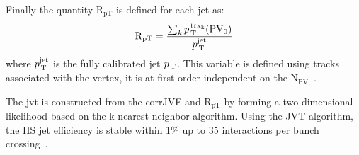 Finally the quantity $\mathrm{R_{pT}}$ is defined for each jet as:
\begin{equation}
  \label{eq:79}
  \mathrm{R_{pT}} = \frac{\sum_k p_\mathrm{\, T}^\mathrm{\, trk_k}
    (\mathrm{PV_0})}{p_\mathrm{\, T}^{\mathrm{jet}}}
\end{equation}
where $p_\mathrm{\, T}^{\mathrm{jet}}$ is the fully calibrated jet $p_\mathrm{\, T}$. This variable is
defined using tracks associated with the vertex, it is at first order
independent on the N$_{\mathrm{PV}}$~\cite{PileUpPerformance}.

The \gls{jvt} is constructed from the corrJVF and $\mathrm{R_{pT}}$ by forming a
two dimensional likelihood based on the k-nearest neighbor algorithm. Using the
JVT algorithm, the HS jet efficiency is stable within 1\% up to 35 interactions
per bunch crossing~\cite{JVT}.
